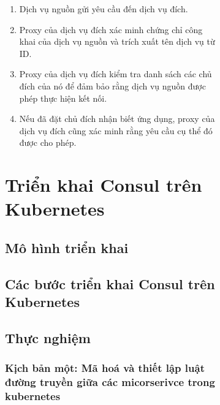 \documentclass[12pt,a4paper]{report}
\begin{document}
\begin{figure}[htp]
\begin{figure}[htp]
	\hspace{0.3cm}{Ngoài việc chỉ định các quy tắc dựa trên dịch vụ nguồn và đích, bạn có thể sử dụng các chủ đích để kiểm soát các phương thức, đường dẫn và tiêu đề HTTP hoặc gRPC nào được ủy quyền. Consul gọi những chủ đích này là nhận biết ứng dụng vì chúng liên quan đến cách ứng dụng thực sự hoạt động. Ví dụ: bạn có thể tạo một chủ đích cho phép cổng vào truy cập vào bất kỳ đường dẫn nào trên dịch vụ giao diện người dùng ngoại trừ /admin.\\}
	
	\hspace{0.3cm}{Cơ chế thực thi chủ đích như sau:}
	
	\begin{enumerate}
	\item Dịch vụ nguồn gửi yêu cầu đến dịch vụ đích.
	\item Proxy của dịch vụ đích xác minh chứng chỉ công khai của dịch vụ nguồn và trích xuất tên dịch vụ từ ID.
	\item Proxy của dịch vụ đích kiểm tra danh sách các chủ đích của nó để đảm bảo rằng dịch vụ nguồn được phép thực hiện kết nối.
	\item Nếu đã đặt chủ đích nhận biết ứng dụng, proxy của dịch vụ đích cũng xác minh rằng yêu cầu cụ thể đó được cho phép.
	\end{enumerate}

	\chapter{Triển khai Consul trên Kubernetes}
	\section{Mô hình triển khai}
	\section{Các bước triển khai Consul trên Kubernetes}
	\section{Thực nghiệm}
	\subsection{Kịch bản một: Mã hoá và thiết lập luật đường truyền giữa các micorserivce trong kubernetes}

\end{figure}
\end{figure}
\end{document}
